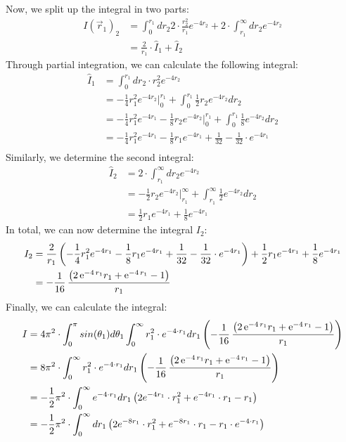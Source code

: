 \documentclass[10pt,a4paper]{article}
\begin{document}
Now, we split up the integral in two parts:
\begin{align}
I(\vec{r}_1)_2&=\int_{0}^{r_1} dr_2 2 \cdot \frac{r_2^2}{r_1} e^{-4 r_2} + 2 \cdot\int_{r_1}^{\infty} dr_2 e^{-4r_2}\\
&= \frac{2}{r_1} \cdot \hat{I}_1 +  \hat{I}_2
\end{align}
Through partial integration, we can calculate the following integral:
\begin{align}
\hat{I}_1&=\int_{0}^{r_1} dr_2 \cdot r_2^2 e^{-4 r_2}\\
&= -\frac{1}{4} r_1^2 e^{-4r_2}|_0^{r_1} +\int_0^{r_1} \frac{1}{2} r_2 e^{-4 r_2}dr_2\\
&=-\frac{1}{4}r_1^2 e^{-4 r_1}-\frac{1}{8}r_2 e^{-4r_2} |_0^{r_1} + \int_0^{r_1} \frac{1}{8} e^{-4 r_2} dr_2\\
&=-\frac{1}{4}r_1^2 e^{-4 r_1}-\frac{1}{8}r_1 e^{-4r_1} + \frac{1}{32}-\frac{1}{32} \cdot e^{-4 r_1}\\
\end{align}
Similarly, we determine the second integral:
\begin{align}
\hat{I}_2 &= 2 \cdot\int_{r_1}^{\infty} dr_2 e^{-4r_2}\\
&= -\frac{1}{2} r_2 e^{-4 r_2} |_{r_1}^{\infty} + \int_{r_1}^{\infty} \frac{1}{2} e^{-4 r_2} dr_2 \\
&=\frac{1}{2} r_1 e^{-4 r_1} + \frac{1}{8} e^{-4 r_1} 
\end{align}
In total, we can now determine the integral $I_2$:
\begin{align}
I_2 &=  \frac{2}{r_1}\left(-\frac{1}{4}r_1^2 e^{-4 r_1}-\frac{1}{8}r_1 e^{-4r_1} + \frac{1}{32}-\frac{1}{32} \cdot e^{-4 r_1}\right) + \frac{1}{2} r_1 e^{-4 r_1} + \frac{1}{8} e^{-4 r_1} \\
&= -\frac{1}{16}\,{\frac { \left( 2\,{{\rm e}^{-
4\,r_1}}r_1+{{\rm e}^{-4\,r_1}}-1 \right) }{r_1}}
\end{align}
Finally, we can calculate the integral:
\begin{align}
I&= 4 \pi^2 \cdot \int_{0}^{ \pi} sin(\theta_1) d\theta_1 \int_{0}^{\infty}  r_1^2 \cdot e^{-4 \cdot r_1} dr_1 \left( -\frac{1}{16}\,{\frac { \left( 2\,{{\rm e}^{-
4\,r_1}}r_1+{{\rm e}^{-4\,r_1}}-1 \right) }{r_1}} \right)\\
&= 8 \pi^2 \cdot \int_{0}^{\infty}  r_1^2 \cdot e^{-4 \cdot r_1} dr_1 \left( -\frac{1}{16}\,{\frac { \left( 2\,{{\rm e}^{-
4\,r_1}}r_1+{{\rm e}^{-4\,r_1}}-1 \right) }{r_1}}\right)\\
&=-\frac{1}{2}\pi^2 \cdot \int_0^{\infty} e^{-4 \cdot r_1} dr_1 \left( 2 e^{-4r_1} \cdot r_1^2 + e^{-4r_1} \cdot r_1 - r_1 \right)\\
&=-\frac{1}{2}\pi^2 \cdot \int_0^{\infty}  dr_1 \left( 2 e^{-8r_1} \cdot r_1^2 + e^{-8r_1} \cdot r_1 - r_1 \cdot e^{-4 \cdot r_1} \right)\\
\end{align}
\end{document}
